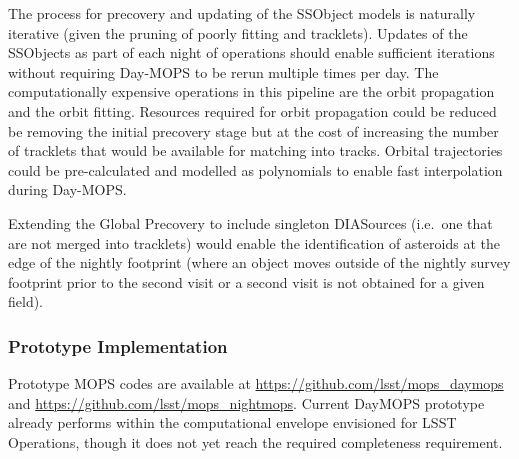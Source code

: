 The process for precovery and updating of the SSObject models is naturally iterative (given the pruning of poorly fitting \DIAObjects and tracklets). Updates of the SSObjects as part of each night of operations should enable sufficient iterations without requiring Day-MOPS to be rerun multiple times per day. The computationally expensive operations in this pipeline are the orbit propagation and the orbit fitting. Resources required for orbit propagation could be reduced be removing the initial precovery stage but at the cost of increasing the number of tracklets that would be available for matching into tracks. Orbital trajectories could be pre-calculated and modelled as polynomials to enable fast interpolation during Day-MOPS.



Extending the Global Precovery to include singleton DIASources (i.e.\ one that are not merged into tracklets) would enable the identification of asteroids at the edge of the nightly footprint (where an object moves outside of the nightly survey footprint prior to the second visit or a second visit is not obtained for a given field).

\subsubsection{Prototype Implementation}

Prototype MOPS codes are available at \url{https://github.com/lsst/mops_daymops} and \url{https://github.com/lsst/mops_nightmops}. Current DayMOPS prototype already performs within the computational envelope envisioned for LSST Operations, though it does not yet reach the required completeness requirement.


